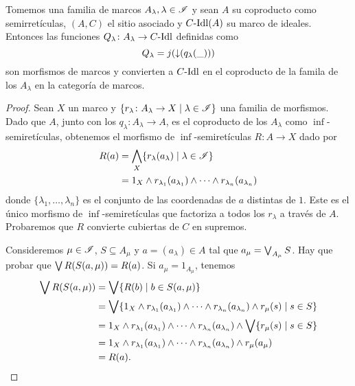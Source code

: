 \begin{lemma}
  Tomemos una familia de marcos $A_\lambda, \lambda\in\mathscr{I}$ y sean
  $A$ su coproducto como semirretículas, $(A,C)$ el sitio asociado y
  $C\text{-}\mathrm{Idl}(A)$ su marco de ideales. Entonces las funciones
  $Q_\lambda\colon A_\lambda\to C\text{-}\mathrm{Idl}$ definidas como
    \[
        Q_\lambda=j({\downarrow}(q_\lambda(\_)))
    \]
  son morfismos de marcos y convierten a $C\text{-}\mathrm{Idl}$ 
  en el coproducto de la famila de los $A_\lambda$
  en la categoría de marcos.
\end{lemma}
\begin{proof}
Sean $X$ un marco y
$\{r_\lambda\colon A_\lambda\to X\mid \lambda\in \mathscr{I}\}$
una familia de morfismos.
Dado que $A$, junto con los $q_\lambda:A_\lambda\to A$,
es el coproducto de los $A_\lambda$ como $\inf$-semiretículas,
obtenemos el morfismo de $\inf$-semiretículas
$R\colon A\to X$ dado por
\begin{align*}
    R(a)
    &=\bigwedge_X \{r_\lambda(a_\lambda)\mid \lambda\in\mathscr{I}\} \\
    &= 1_X\wedge r_{\lambda_1}(a_{\lambda_1})\wedge\cdots\wedge r_{\lambda_n}(a_{\lambda_n})
\end{align*}
donde $\{\lambda_1,\dots,\lambda_n\}$ es el conjunto
de las coordenadas de $a$ distintas de $1$.
Este es el único morfismo de $\inf$-semiretículas que
factoriza a todos los $r_\lambda$ a través de $A$.
Probaremos que $R$ convierte cubiertas de $C$ en supremos.

Consideremos $\mu\in\mathscr{I}$, $S\subseteq A_\mu$ y $a=(a_\lambda)\in A$ tal que $a_\mu=\bigvee_{A_\mu} S$.
Hay que probar que $\bigvee R(S(a,\mu)) = R(a)$.
Si $a_\mu= 1_{A_\mu}$, tenemos
\begin{align*}
    \bigvee R(S(a,\mu))
    &= \bigvee\{R(b) \mid b\in S(a,\mu)\} \\
    &= \bigvee\{ 1_X\wedge r_{\lambda_1}(a_{\lambda_1})\wedge
        \cdots\wedge r_{\lambda_n}(a_{\lambda_n}) \wedge r_\mu(s) \mid s\in S\} \\
    &= 1_X\wedge r_{\lambda_1}(a_{\lambda_1})\wedge
        \cdots\wedge r_{\lambda_n}(a_{\lambda_n}) \wedge
        \bigvee\{ r_\mu(s) \mid s\in S\} \\
    &= 1_X\wedge r_{\lambda_1}(a_{\lambda_1})\wedge
        \cdots\wedge r_{\lambda_n}(a_{\lambda_n}) \wedge
        r_\mu(a_\mu) \\
    &= R(a).
\end{align*}


\end{proof}
